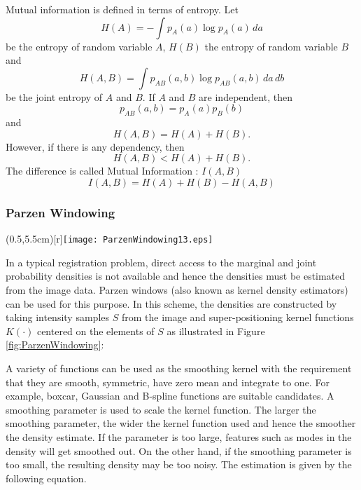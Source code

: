 Mutual information is defined in terms of entropy. Let
\begin{equation}
H(A) = - \int p_A(a) \log p_A(a)\, da
\end{equation}
be the entropy of random variable $A$, $H(B)$ the entropy of 
random variable $B$ and 
\begin{equation}
H(A,B) = \int p_{AB}(a,b) \log p_{AB}(a,b)\,da\,db
\end{equation}
be the joint entropy of $A$ and $B$. If $A$ and $B$ are independent, then
\begin{equation}
p_{AB}(a,b) = p_A(a) p_B(b)
\end{equation}
and
\begin{equation}
H(A,B) = H(A) + H(B).
\end{equation}
However, if there is any dependency, then
\begin{equation}
H(A,B)<H(A)+H(B).
\end{equation}
The difference is called Mutual Information : \( I(A,B) \)
\begin{equation}
I(A,B)=H(A)+H(B)-H(A,B)
\end{equation}

\subsubsection{Parzen Windowing}

\parpic(0.5\textwidth,5.5cm)[r]{\texttt{[image: ParzenWindowing13.eps]}}

In a typical registration problem, direct access to the marginal 
and joint probability densities is not available and hence the
densities must be estimated from the image data. Parzen windows 
(also known as kernel density estimators) can be used for this purpose.
In this scheme, the densities are constructed by taking intensity 
samples $S$ from the image and super-positioning kernel functions 
$K(\cdot)$ centered on the elements of $S$ as illustrated in
Figure \ref{fig:ParzenWindowing}:

A variety of functions can be used as the smoothing kernel with the
requirement that they are smooth, symmetric, have zero mean and
integrate to one. For example, boxcar, Gaussian and B-spline functions are
suitable candidates.  A smoothing parameter is used to scale the kernel
function.  The larger the smoothing parameter, the wider the kernel function
used and hence the smoother the density estimate. If the parameter is too
large, features such as modes in the density will get smoothed out.  On the
other hand, if the smoothing parameter is too small, the resulting density
may be too noisy. The estimation is given by the following equation.

